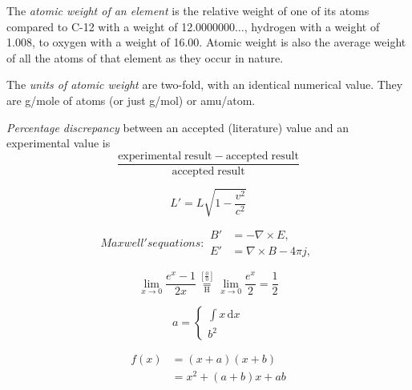 \documentclass[twoside,10pt,openany,a4paper]{rapport}
\begin{document}
  \begin{enumerate}
    \begin{item}
      The \emph{atomic weight of an element} is the relative weight of one of its atoms compared to C-12 with a weight of 12.0000000$\ldots$, hydrogen with a weight of 1.008, to oxygen with a weight of 16.00. Atomic weight is also the average weight of all the atoms of that element as they occur in nature.
    \end{item}

    \begin{item}
      The \emph{units of atomic weight} are two-fold, with an identical numerical value. They are g/mole of atoms (or just g/mol) or amu/atom.
    \end{item}
    
    \begin{item}
      \emph{Percentage discrepancy} between an accepted (literature) value and an experimental value is
      \begin{equation*}
        \frac{\mathrm{experimental\;result} - \mathrm{accepted\;result}}{\mathrm{accepted\;result}}
      \end{equation*}
    \end{item}
  \end{enumerate}

  \begin{equation}
    L' = {L}{\sqrt{1-\frac{v^2}{c^2}}}
  \end{equation}
  
  \begin{subequations}
    Maxwell's equations:
    \begin{align}
      B'&=-\nabla \times E,\\
      E'&=\nabla \times B - 4\pi j,
    \end{align}
  \end{subequations}

  \[
  \lim_{x\to 0}{\frac{e^x-1}{2x}}
  \overset{\left[\frac{0}{0}\right]}{\underset{\mathrm{H}}{=}}
  \lim_{x\to 0}{\frac{e^x}{2}}={\frac{1}{2}}
  \]

  \[
  a =
  \begin{cases}
    \int x\, \mathrm{d} x\\
    b^2
  \end{cases}
  \]


  \begin{align*}
    f(x) &= (x+a)(x+b) \\
    &= x^2 + (a+b)x + ab
  \end{align*}
\end{document}
